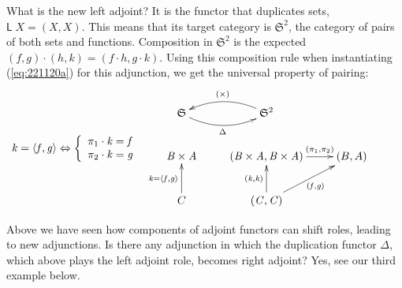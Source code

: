 \documentclass{elsarticle}
\newcommand{\Conid}[1]{\mathit{#1}}
\newcommand{\Varid}[1]{\mathit{#1}}
\def\myxym#1{\vcenter{\xymatrix{#1}}}
\def\xarrayin#1{\begin{array}{ccccccc}#1\end{array}}
\newenvironment{lcbr}{\left\{\begin{array}{l}}{\end{array}\right.}
\def\comp{ \mathbin{\cdot} }
\def\fun#1{\mathsf{#1}}
\def\p#1{\pi_{#1}}
\def\conj#1#2{\mathopen{\langle} #1, #2 \mathclose{\rangle}}
\def\cat#1{{\mathfrak #1}}
\def\equiv{\Leftrightarrow}
\begin{document}
What is the new left adjoint? It is the functor that duplicates sets, \ensuremath{\fun L \;\Conid{X}\mathrel{=}(\Conid{X},\Conid{X})}. This
means that its target category is \ensuremath{{\cat{S}}^{\mathrm{2}}}, the category of pairs of both sets and functions.
Composition in \ensuremath{{\cat{S}}^{\mathrm{2}}} is the expected \ensuremath{(\Varid{f},\Varid{g}) \comp (\Varid{h},\Varid{k})\mathrel{=}(\Varid{f} \comp \Varid{h},\Varid{g} \comp \Varid{k})}.
Using this composition rule when instantiating (\ref{eq:221120a}) for this adjunction,
we get the universal property of pairing:
\begin{eqnarray*}
\hskip -3em
\xarrayin{
	\ensuremath{\Varid{k}\mathrel{=}\conj{\Varid{f}}{\Varid{g}}}  \equiv \ensuremath{\begin{lcbr}\p1 \comp \Varid{k}\mathrel{=}\Varid{f}\\\p2 \comp \Varid{k}\mathrel{=}\Varid{g}\end{lcbr}}
}
%
\myxym{
	\ensuremath{\cat{S}}
		\ar@/_0.9pc/[r]_-{\ensuremath{\Delta }}
&
	\ensuremath{{\cat{S}}^{\mathrm{2}}}
		\ar@/_0.9pc/[l]_-{\ensuremath{( \times )}}
\\
\ensuremath{\Conid{B} \times \Conid{A}}
&
\ensuremath{(\Conid{B} \times \Conid{A},\Conid{B} \times \Conid{A})}
	\ar[r]^-{\ensuremath{(\p1,\p2)}}
&
(B,A)
\\
C
	\ar[u]^{\ensuremath{\Varid{k}\mathrel{=}\conj{\Varid{f}}{\Varid{g}}}}
&
\ensuremath{(\Conid{C},\Conid{C})}
	\ar[u]^{\ensuremath{(\Varid{k},\Varid{k})}}
	\ar[ru]_{\ensuremath{(\Varid{f},\Varid{g})}}
}
\end{eqnarray*}

Above we have seen how components of adjoint functors can shift roles, leading to new adjunctions.
Is there any adjunction in which the duplication functor \ensuremath{\Delta }, which above plays the
left adjoint role, becomes right adjoint? Yes, see our third example below.
\end{document}
